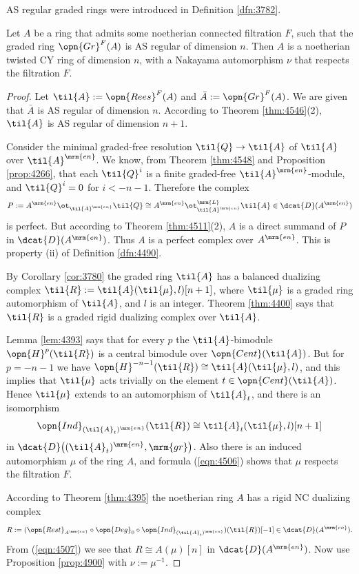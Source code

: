 AS regular graded rings were introduced in Definition \ref{dfn:3782}. 

\begin{thm} \label{thm:4490}
Let $A$ be a ring that admits some noetherian connected filtration $F$, such 
that the graded ring $\opn{Gr}^F(A)$ is AS regular of dimension $n$. 
Then $A$ is a noetherian twisted CY ring of dimension $n$, with a Nakayama 
automorphism $\nu$ that respects the filtration $F$. 
\end{thm}

\begin{proof}
Let $\til{A} := \opn{Rees}^F(A)$ and $\bar{A} := \opn{Gr}^F(A)$.
We are given that $\bar{A}$ is AS regular of dimension $n$. According to 
Theorem \ref{thm:4546}(2), $\til{A}$ is AS regular of dimension 
$n + 1$. 

Consider the minimal graded-free resolution 
$\til{Q} \to \til{A}$ of $\til{A}$ over $\til{A}^{\mrm{en}}$.
We know, from Theorem \ref{thm:4548}  and Proposition \ref{prop:4266}, that 
each $\til{Q}^i$ is a 
finite graded-free 
$\til{A}^{\mrm{en}}$-module, and $\til{Q}^i = 0$ for $i < -n -1$. 
Therefore the complex 
\[ P := A^{\mrm{en}} \ot_{\til{A}^{\mrm{en}}} \til{Q} \cong 
A^{\mrm{en}} \ot^{\mrm{L}}_{\til{A}^{\mrm{en}}} \til{A} \in 
\dcat{D}(A^{\mrm{en}}) \]
is perfect. But according to Theorem \ref{thm:4511}(2), $A$ is a direct summand 
of $P$ in $\dcat{D}(A^{\mrm{en}})$. Thus $A$ is a perfect complex over 
$A^{\mrm{en}}$. This is property (ii) of Definition \ref{dfn:4490}.

By Corollary \ref{cor:3780} the graded ring $\til{A}$
has a balanced dualizing complex
$\til{R} := \til{A}(\til{\mu}, l)[n + 1]$,
where $\til{\mu}$ is a graded ring automorphism of $\til{A}$, and $l$ is an 
integer. Theorem \ref{thm:4400} says that $\til{R}$ is a graded rigid dualizing 
complex over $\til{A}$. 

Lemma \ref{lem:4393} says that for every $p$ the $\til{A}$-bimodule 
$\opn{H}^{p}(\til{R})$ is a central bimodule over $\opn{Cent}(\til{A})$.
But for $p = -n - 1$ we have 
$\opn{H}^{-n - 1}(\til{R}) \cong \til{A}(\til{\mu}, l)$,
and this implies that $\til{\mu}$ acts trivially on the element 
$t \in \opn{Cent}(\til{A})$. Hence $\til{\mu}$ extends to an 
automorphism of $\til{A}_t$, and there is an isomorphism
\begin{equation} \label{eqn:4507}
\opn{Ind}_{(\til{A}_t)^{\mrm{en}}} (\til{R}) \cong 
\til{A}_t(\til{\mu}, l)[n + 1]
\end{equation}
in $\dcat{D} \bigl( (\til{A}_t)^{\mrm{en}}, \mrm{gr} \bigr)$. 
Also there is an induced automorphism $\mu$ of the ring 
$A$, and formula (\ref{eqn:4506}) shows that $\mu$ respects the filtration $F$. 

According to Theorem \ref{thm:4395} the noetherian ring $A$ 
has a rigid NC dualizing complex 
\[ R := (\opn{Rest}_{A^{\mrm{en}}} \circ \opn{Deg}_0 \circ 
\opn{Ind}_{(\til{A}_t)^{\mrm{en}}}) (\til{R})[-1] \in \dcat{D}(A^{\mrm{en}}) . 
\]
From (\ref{eqn:4507}) we see that $R \cong A(\mu)[n]$ 
in $\dcat{D}(A^{\mrm{en}})$. Now use Proposition \ref{prop:4900} with 
$\nu := \mu^{-1}$. 
\end{proof}

